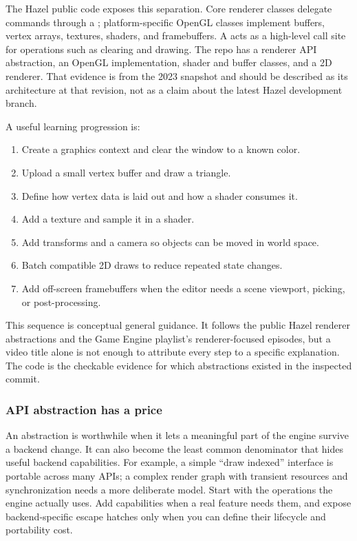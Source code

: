 The Hazel public code exposes this separation. Core renderer classes delegate commands through a ; platform-specific OpenGL classes implement buffers, vertex arrays, textures, shaders, and framebuffers. A  acts as a high-level call site for operations such as clearing and drawing. The repo has a renderer API abstraction, an OpenGL implementation, shader and buffer classes, and a 2D renderer. That evidence is from the 2023 snapshot and should be described as its architecture at that revision, not as a claim about the latest Hazel development branch.

A useful learning progression is:

\begin{enumerate}
\def\labelenumi{\arabic{enumi}.}
\tightlist
\item
  Create a graphics context and clear the window to a known color.
\item
  Upload a small vertex buffer and draw a triangle.
\item
  Define how vertex data is laid out and how a shader consumes it.
\item
  Add a texture and sample it in a shader.
\item
  Add transforms and a camera so objects can be moved in world space.
\item
  Batch compatible 2D draws to reduce repeated state changes.
\item
  Add off-screen framebuffers when the editor needs a scene viewport, picking, or post-processing.
\end{enumerate}

This sequence is conceptual general guidance. It follows the public Hazel renderer abstractions and the Game Engine playlist's renderer-focused episodes, but a video title alone is not enough to attribute every step to a specific explanation. The code is the checkable evidence for which abstractions existed in the inspected commit.

\subsubsection{API abstraction has a price}\label{06-engine-ii-ch025-api-abstraction-has-a-price}

\hypertarget{06-engine-ii-ch025-api-abstraction-has-a-price}{}

An abstraction is worthwhile when it lets a meaningful part of the engine survive a backend change. It can also become the least common denominator that hides useful backend capabilities. For example, a simple ``draw indexed'' interface is portable across many APIs; a complex render graph with transient resources and synchronization needs a more deliberate model. Start with the operations the engine actually uses. Add capabilities when a real feature needs them, and expose backend-specific escape hatches only when you can define their lifecycle and portability cost.

